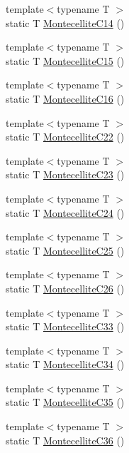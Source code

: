 \begin{DoxyCompactItemize}
{\footnotesize template$<$typename T $>$ }\\static T \mbox{\hyperlink{namespacempc_1_1data_a2fe4c4d4e7c87e190a3644aba15711b3}{Montecellite\+C14}} ()
\item 
{\footnotesize template$<$typename T $>$ }\\static T \mbox{\hyperlink{namespacempc_1_1data_a29c01f309c277c2dd55e2dc85a51b011}{Montecellite\+C15}} ()
\item 
{\footnotesize template$<$typename T $>$ }\\static T \mbox{\hyperlink{namespacempc_1_1data_acab0caa06748c8a1af345753adfd25d1}{Montecellite\+C16}} ()
\item 
{\footnotesize template$<$typename T $>$ }\\static T \mbox{\hyperlink{namespacempc_1_1data_ae6e86895e32b60d682c15d0cf5643f4d}{Montecellite\+C22}} ()
\item 
{\footnotesize template$<$typename T $>$ }\\static T \mbox{\hyperlink{namespacempc_1_1data_ab83633eb58c6e8449c218fef7cfedf0d}{Montecellite\+C23}} ()
\item 
{\footnotesize template$<$typename T $>$ }\\static T \mbox{\hyperlink{namespacempc_1_1data_a9d81c81a87e42c4877c00deae9bf5871}{Montecellite\+C24}} ()
\item 
{\footnotesize template$<$typename T $>$ }\\static T \mbox{\hyperlink{namespacempc_1_1data_ad0e5198190c0696a536e407e350851e3}{Montecellite\+C25}} ()
\item 
{\footnotesize template$<$typename T $>$ }\\static T \mbox{\hyperlink{namespacempc_1_1data_af9c89c66a4f4e019de095c8f75732015}{Montecellite\+C26}} ()
\item 
{\footnotesize template$<$typename T $>$ }\\static T \mbox{\hyperlink{namespacempc_1_1data_a856b9cc76b856bc0f8741eb8b79bec4d}{Montecellite\+C33}} ()
\item 
{\footnotesize template$<$typename T $>$ }\\static T \mbox{\hyperlink{namespacempc_1_1data_ade7d10ae47d78a7ac06753ddd57ea015}{Montecellite\+C34}} ()
\item 
{\footnotesize template$<$typename T $>$ }\\static T \mbox{\hyperlink{namespacempc_1_1data_ac7fed3eb7bcbf6b6e25d86948b52e088}{Montecellite\+C35}} ()
\item 
{\footnotesize template$<$typename T $>$ }\\static T \mbox{\hyperlink{namespacempc_1_1data_af28fd1a2f9a243ce17c471772d894666}{Montecellite\+C36}} ()

\end{DoxyCompactItemize}
